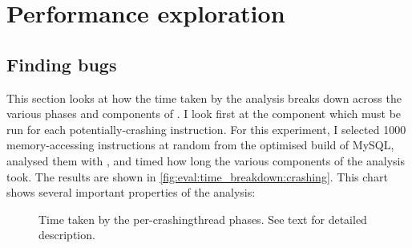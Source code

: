 \section{Performance exploration}
\label{sect:eval:time_details}

\subsection{Finding bugs}
This section looks at how the time taken by the analysis breaks down
across the various phases and components of {\implementation}.  I look
first at the component which must be run for each potentially-crashing
instruction.  For this experiment, I selected 1000 memory-accessing
instructions at random from the optimised build of MySQL, analysed
them with {\implementation}, and timed how long the various components
of the analysis took.  The results are shown in
\autoref{fig:eval:time_breakdown:crashing}.  This chart shows
several important properties of the analysis:

\begin{figure}
  
  \caption{Time taken by the per-\gls{crashingthread} phases.  See
    text for detailed description.}
  \label{fig:eval:time_breakdown:crashing}
\end{figure}

